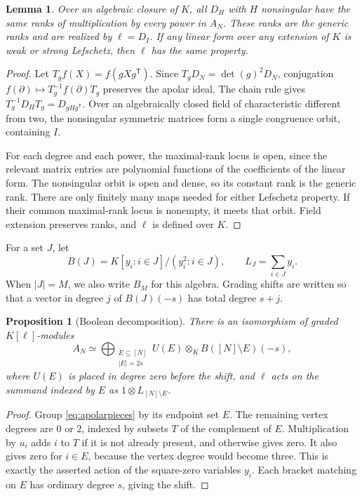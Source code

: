 \documentclass[11pt]{article}
\newtheorem{proposition}[theorem]{Proposition}
\newtheorem{lemma}[theorem]{Lemma}
\theoremstyle{definition}
\theoremstyle{remark}
\numberwithin{equation}{section}
\newcommand{\kk}{K}
\begin{document}
\begin{lemma}\label{lem:openorbit}
Over an algebraic closure of $\kk$, all $D_H$ with $H$ nonsingular have
the same ranks of multiplication by every power in $A_N$. These ranks
are the generic ranks and are realized by $\ell=D_I$. If any linear
form over any extension of $\kk$ is weak or strong Lefschetz, then
$\ell$ has the same property.
\end{lemma}

\begin{proof}
Let $T_gf(X)=f(gXg^{\mathsf T})$. Since $T_gD_N=\det(g)^2D_N$,
conjugation $f(\partial)\mapsto T_g^{-1}f(\partial)T_g$ preserves the
apolar ideal. The chain rule gives
$T_g^{-1}D_HT_g=D_{gHg^{\mathsf T}}$.
Over an algebraically closed field of characteristic different from
two, the nonsingular symmetric matrices form a single congruence orbit,
containing $I$.

For each degree and each power, the maximal-rank locus is open, since
the relevant matrix entries are polynomial functions of the coefficients
of the linear form. The nonsingular orbit is open and dense, so its
constant rank is the generic rank. There are only finitely many maps
needed for either Lefschetz property. If their common maximal-rank
locus is nonempty, it meets that orbit. Field extension preserves ranks,
and $\ell$ is defined over $\kk$.
\end{proof}

For a set $J$, let
\[
 B(J)=\kk[y_i:i\in J]/(y_i^2:i\in J),
 \qquad L_J=\sum_{i\in J}y_i.
\]
When $|J|=M$, we also write $B_M$ for this algebra. Grading shifts are
written so that a vector in degree $j$ of $B(J)(-s)$ has total degree
$s+j$.

\begin{proposition}[Boolean decomposition]\label{prop:boolean}
There is an isomorphism of graded $\kk[\ell]$-modules
\begin{equation}\label{eq:boolean}
 A_N\simeq
 \bigoplus_{\substack{E\subseteq[N]\\|E|=2s}}
       U(E)\otimes_\kk B([N]\setminus E)(-s),
\end{equation}
where $U(E)$ is placed in degree zero before the shift, and $\ell$
acts on the summand indexed by $E$ as $1\otimes L_{[N]\setminus E}$.
\end{proposition}

\begin{proof}
Group \eqref{eq:apolarpieces} by its endpoint set $E$. The remaining
vertex degrees are $0$ or $2$, indexed by subsets $T$ of the complement
of $E$. Multiplication by $u_i$ adds $i$ to $T$ if it is not already
present, and otherwise gives zero. It also gives zero for $i\in E$,
because the vertex degree would become three. This is exactly the
asserted action of the square-zero variables $y_i$. Each bracket
matching on $E$ has ordinary degree $s$, giving the shift.
\end{proof}
\end{document}
